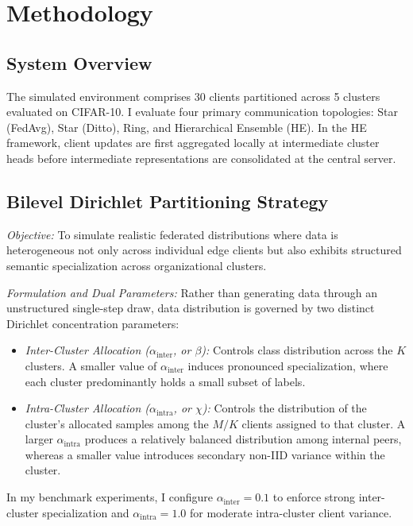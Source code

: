 \documentclass[11pt, a4paper]{article}
\begin{document}
\section{Methodology}

\subsection{System Overview}
The simulated environment comprises 30 clients partitioned across 5 clusters evaluated on CIFAR-10. I evaluate four primary communication topologies: Star (FedAvg), Star (Ditto), Ring, and Hierarchical Ensemble (HE). In the HE framework, client updates are first aggregated locally at intermediate cluster heads before intermediate representations are consolidated at the central server.

\subsection{Bilevel Dirichlet Partitioning Strategy}
\textit{Objective:} To simulate realistic federated distributions where data is heterogeneous not only across individual edge clients but also exhibits structured semantic specialization across organizational clusters.

\textit{Formulation and Dual Parameters:} Rather than generating data through an unstructured single-step draw, data distribution is governed by two distinct Dirichlet concentration parameters:
\begin{itemize}
    \item \textit{Inter-Cluster Allocation ($\alpha_{\text{inter}}$, or $\beta$):} Controls class distribution across the $K$ clusters. A smaller value of $\alpha_{\text{inter}}$ induces pronounced specialization, where each cluster predominantly holds a small subset of labels.
    \item \textit{Intra-Cluster Allocation ($\alpha_{\text{intra}}$, or $\chi$):} Controls the distribution of the cluster's allocated samples among the $M/K$ clients assigned to that cluster. A larger $\alpha_{\text{intra}}$ produces a relatively balanced distribution among internal peers, whereas a smaller value introduces secondary non-IID variance within the cluster.
\end{itemize}

In my benchmark experiments, I configure $\alpha_{\text{inter}} = 0.1$ to enforce strong inter-cluster specialization and $\alpha_{\text{intra}} = 1.0$ for moderate intra-cluster client variance.
\end{document}
